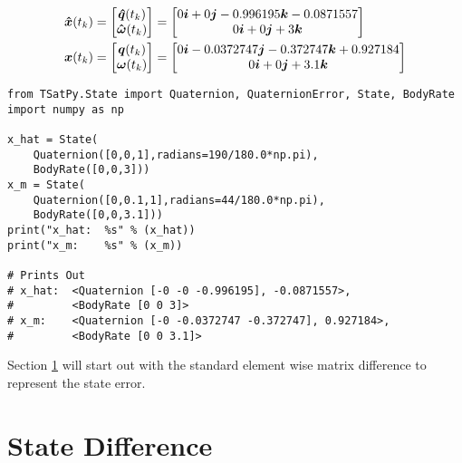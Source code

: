 \begin{subequations}
  \begin{align}
    \boldsymbol{\hat{x}}(t_{k})
    = \begin{bmatrix}  \boldsymbol{\hat{q}}(t_{k}) \\ \boldsymbol{\hat{\omega}}(t_{k}) \end{bmatrix}
    &= \begin{bmatrix} 0 \boldsymbol{i} +0 \boldsymbol{j} -0.996195 \boldsymbol{k} -0.0871557 \\ 0 \boldsymbol{i} +0 \boldsymbol{j} +3 \boldsymbol{k} \end{bmatrix}\\
    \boldsymbol{x}(t_{k})
    = \begin{bmatrix}  \boldsymbol{q}(t_{k}) \\ \boldsymbol{\omega}(t_{k}) \end{bmatrix}
    &= \begin{bmatrix} 0 \boldsymbol{i} -0.0372747 \boldsymbol{j} -0.372747 \boldsymbol{k} +0.927184 \\ 0 \boldsymbol{i} +0 \boldsymbol{j} +3.1 \boldsymbol{k} \end{bmatrix}
  \end{align}
  \label{eqn:StateDifferenceQuaternionSamples}
\end{subequations}

\begin{singlespace}
  \begin{verbatim}
from TSatPy.State import Quaternion, QuaternionError, State, BodyRate
import numpy as np

x_hat = State(
    Quaternion([0,0,1],radians=190/180.0*np.pi),
    BodyRate([0,0,3]))
x_m = State(
    Quaternion([0,0.1,1],radians=44/180.0*np.pi),
    BodyRate([0,0,3.1]))
print("x_hat:  %s" % (x_hat))
print("x_m:    %s" % (x_m))

# Prints Out
# x_hat:  <Quaternion [-0 -0 -0.996195], -0.0871557>,
#         <BodyRate [0 0 3]>
# x_m:    <Quaternion [-0 -0.0372747 -0.372747], 0.927184>,
#         <BodyRate [0 0 3.1]>
  \end{verbatim}
\nocite{minted}
\end{singlespace}

Section \ref{sec:StateDifference} will start out with the standard element wise matrix difference to represent the state error.

\section{State Difference}
\label{sec:StateDifference}

